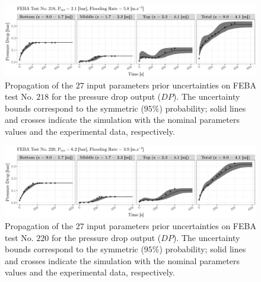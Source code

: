 \begin{figure}[bth]
    \centering
    \includegraphics[width=1.0\textwidth]{../figures/chapter2/figures/plotTraceUQPriorDP218}
    \caption[Propagation of the $27$ input parameters prior uncertainties on FEBA test No. $218$ for the pressure drop output ($DP$).]{Propagation of the $27$ input parameters prior uncertainties on FEBA test No. $218$ for the pressure drop output ($DP$). The uncertainty bounds correspond to the symmetric ($95\%$) probability; solid lines and crosses indicate the simulation with the nominal parameters values and the experimental data, respectively.}
    \label{fig:ch2_plot_trace_uq_prior_dp_218}
\end{figure}

\begin{figure}[bth]
    \centering
    \includegraphics[width=1.0\textwidth]{../figures/chapter2/figures/plotTraceUQPriorDP220}
    \caption[Propagation of the $27$ input parameters prior uncertainties on FEBA test No. $220$ for the pressure drop output ($DP$).]{Propagation of the $27$ input parameters prior uncertainties on FEBA test No. $220$ for the pressure drop output ($DP$). The uncertainty bounds correspond to the symmetric ($95\%$) probability; solid lines and crosses indicate the simulation with the nominal parameters values and the experimental data, respectively.}
    \label{fig:ch2_plot_trace_uq_prior_dp_220}
\end{figure}

